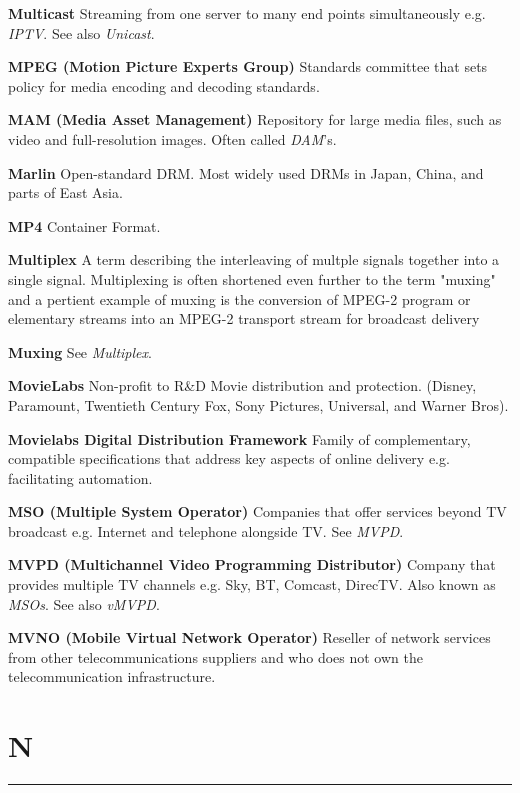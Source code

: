 \smallskip
\textbf{Multicast}
Streaming from one server to many end points simultaneously e.g. \textit{IPTV}.  See also \textit{Unicast}.

\smallskip
\textbf{MPEG (Motion Picture Experts Group)}
Standards committee that sets policy for media encoding and decoding standards.

\smallskip
\textbf{MAM (Media Asset Management)}
Repository for large media files, such as video and full-resolution images. Often called \textit{DAM}'s.

\smallskip
\textbf{Marlin}
Open-standard DRM. Most widely used DRMs in Japan, China, and parts of East Asia.

\smallskip
\textbf{MP4}
Container Format.

\smallskip
\textbf{Multiplex}
A term describing the interleaving of multple signals together into a single signal. Multiplexing is often shortened even further to the term "muxing" and a pertient example of muxing is the conversion of MPEG-2 program or elementary streams into an MPEG-2 transport stream for broadcast delivery

\smallskip
\textbf{Muxing}
See \textit{Multiplex}.

\smallskip
\textbf{MovieLabs}
Non-profit to R\&D Movie distribution and protection. (Disney, Paramount, Twentieth Century Fox, Sony Pictures, Universal, and Warner Bros).

\smallskip
\textbf{Movielabs Digital Distribution Framework}
Family of complementary, compatible specifications that address key aspects of online delivery e.g. facilitating automation.

\smallskip
\textbf{MSO (Multiple System Operator)}
Companies that offer services beyond TV broadcast e.g. Internet and telephone alongside TV.  See \textit{MVPD}.

\smallskip
\textbf{MVPD (Multichannel Video Programming Distributor)}
Company that provides multiple TV channels e.g. Sky, BT, Comcast, DirecTV. Also known as \textit{MSOs}. See also \textit{vMVPD}.

\smallskip
\textbf{MVNO (Mobile Virtual Network Operator)}
Reseller of network services from other telecommunications suppliers and who does not own the telecommunication infrastructure.


\section{N}
\hrule

